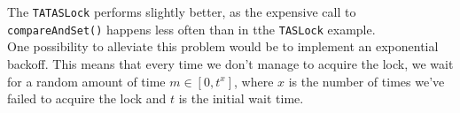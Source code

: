 \documentclass[main]{subfiles}
\begin{document}
The \texttt{TATASLock} performs slightly better, as the expensive call to \texttt{compareAndSet()} happens less often than in tthe \texttt{TASLock} example.\\[3mm]
One possibility to alleviate this problem would be to implement an exponential backoff. This means that every time we don't manage to acquire the lock, we wait for a random amount of time $m \in [0,t^x]$, where $x$ is the number of times we've failed to acquire the lock and $t$ is the initial wait time.

\newpage

\end{document}
